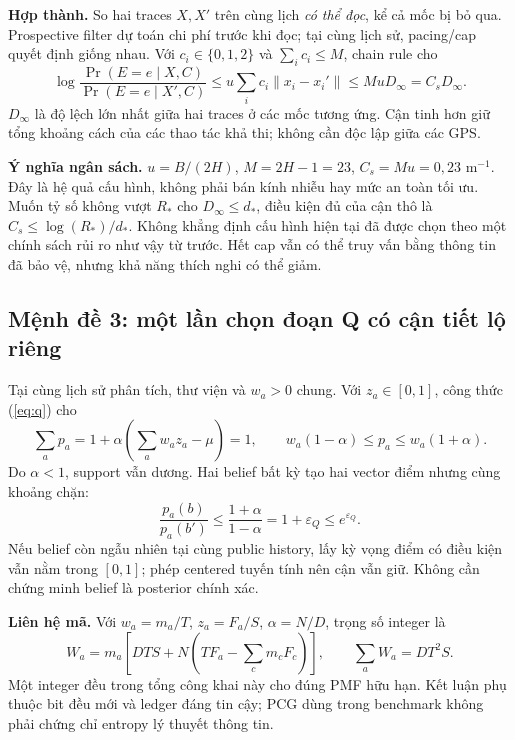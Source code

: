\documentclass[10pt,a4paper]{article}
\begin{document}
\textbf{Hợp thành.} So hai traces $X,X'$ trên cùng lịch \emph{có thể đọc}, kể cả mốc bị bỏ qua.
Prospective filter dự toán chi phí trước khi đọc; tại cùng lịch sử, pacing/cap quyết định giống nhau.
Với $c_i\in\{0,1,2\}$ và $\sum_ic_i\le M$, chain rule cho
\begin{equation}
\log\frac{\Pr(E=e\mid X,C)}{\Pr(E=e\mid X',C)}
\le u\sum_ic_i\|x_i-x_i'\|\le MuD_\infty=C_sD_\infty.
\label{eq:geosession}
\end{equation}
$D_\infty$ là độ lệch lớn nhất giữa hai traces ở các mốc tương ứng. Cận tinh hơn giữ tổng khoảng cách
của các thao tác khả thi; không cần độc lập giữa các GPS.

\textbf{Ý nghĩa ngân sách.} $u=B/(2H)$, $M=2H-1=23$, $C_s=Mu=0{,}23$ m$^{-1}$.
Đây là hệ quả cấu hình, không phải bán kính nhiễu hay mức an toàn tối ưu. Muốn tỷ số không vượt $R_*$
cho $D_\infty\le d_*$, điều kiện đủ của cận thô là $C_s\le\log(R_*)/d_*$.
Không khẳng định cấu hình hiện tại đã được chọn theo một chính sách rủi ro như vậy từ trước.
Hết cap vẫn có thể truy vấn bằng thông tin đã bảo vệ, nhưng khả năng thích nghi có thể giảm.

\clearpage
\subsection{Mệnh đề 3: một lần chọn đoạn Q có cận tiết lộ riêng}
Tại cùng lịch sử phân tích, thư viện và $w_a>0$ chung. Với $z_a\in[0,1]$, công thức (\ref{eq:q}) cho
\begin{equation}
\sum_ap_a=1+\alpha\left(\sum_aw_az_a-\mu\right)=1,\qquad
w_a(1-\alpha)\le p_a\le w_a(1+\alpha).
\label{eq:normalization}
\end{equation}
Do $\alpha<1$, support vẫn dương. Hai belief bất kỳ tạo hai vector điểm nhưng cùng khoảng chặn:
\begin{equation}
\boxed{\frac{p_a(b)}{p_a(b')}\le\frac{1+\alpha}{1-\alpha}=1+\varepsilon_Q\le e^{\varepsilon_Q}.}
\label{eq:qbound}
\end{equation}
Nếu belief còn ngẫu nhiên tại cùng public history, lấy kỳ vọng điểm có điều kiện vẫn nằm trong $[0,1]$;
phép centered tuyến tính nên cận vẫn giữ. Không cần chứng minh belief là posterior chính xác.

\textbf{Liên hệ mã.} Với $w_a=m_a/T$, $z_a=F_a/S$, $\alpha=N/D$, trọng số integer là
\[
W_a=m_a\left[DTS+N\left(TF_a-\sum_cm_cF_c\right)\right],\qquad\sum_aW_a=DT^2S.
\]
Một integer đều trong tổng công khai này cho đúng PMF hữu hạn. Kết luận phụ thuộc bit đều mới và
ledger đáng tin cậy; PCG dùng trong benchmark không phải chứng chỉ entropy lý thuyết thông tin.
\end{document}
